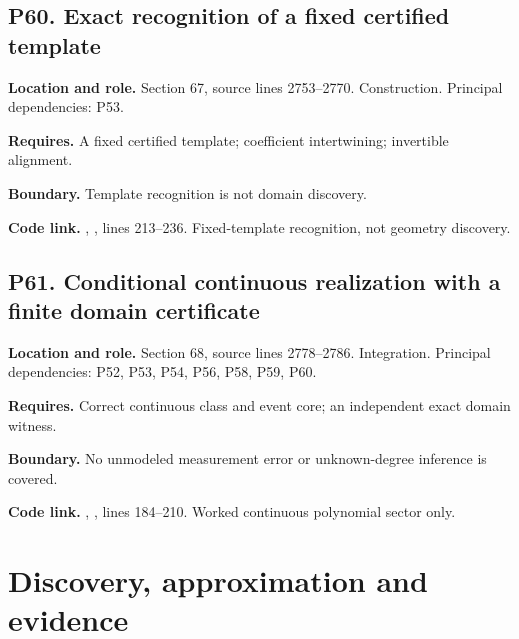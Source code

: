 \documentclass[11pt,oneside,openany]{book}
\numberwithin{equation}{section}
\begin{document}
\par\noindent\begin{minipage}{\textwidth}
\subsection{P60. Exact recognition of a fixed certified
template}\label{LSMRegister:p60.-exact-recognition-of-a-fixed-certified-template}

\textbf{Location and role.} Section 67, source lines 2753--2770.
Construction. Principal dependencies: P53.

\textbf{Requires.} A fixed certified template; coefficient intertwining;
invertible alignment.

\textbf{Boundary.} Template recognition is not domain discovery.

\textbf{Code link.} ,
, lines 213--236. Fixed-template
recognition, not geometry discovery.
\end{minipage}\par\medskip

\par\noindent\begin{minipage}{\textwidth}
\subsection{P61. Conditional continuous realization with a finite domain
certificate}\label{LSMRegister:p61.-conditional-continuous-realization-with-a-finite-domain-certificate}

\textbf{Location and role.} Section 68, source lines 2778--2786.
Integration. Principal dependencies: P52, P53, P54, P56, P58, P59, P60.

\textbf{Requires.} Correct continuous class and event core; an
independent exact domain witness.

\textbf{Boundary.} No unmodeled measurement error or unknown-degree
inference is covered.

\textbf{Code link.} ,
, lines 184--210. Worked continuous
polynomial sector only.
\end{minipage}\par\medskip


\section{Discovery, approximation and
evidence}\label{LSMRegister:discovery-approximation-and-evidence}
\end{document}
